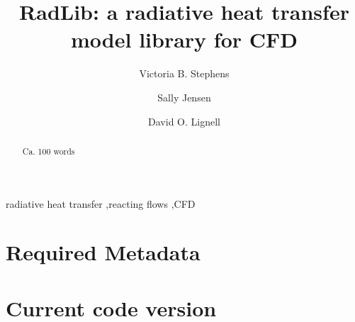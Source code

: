 \documentclass[preprint,12pt, a4paper]{elsarticle}
\begin{document}
\begin{frontmatter}



\title{RadLib: a radiative heat transfer model library for CFD}


\author{Victoria B. Stephens}
\author{Sally Jensen}
\author{David O. Lignell}


\address{Department of Chemical Engineering, Brigham Young University, Provo, UT 84602, United States}

\begin{abstract}
Ca. 100 words
\end{abstract}

\begin{keyword}
radiative heat transfer \sep reacting flows  \sep CFD
\end{keyword}

\end{frontmatter}

\section*{Required Metadata}
\label{}

\section*{Current code version}
\label{}
\end{document}

